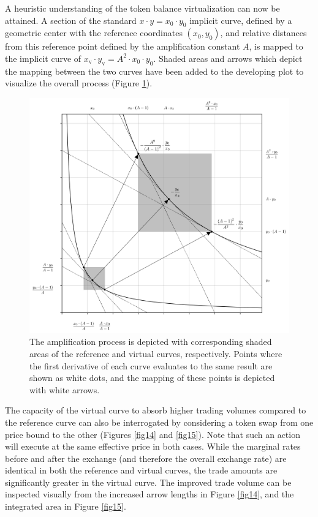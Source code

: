\documentclass{article}
\begin{document}
A heuristic understanding of the token balance virtualization can now be attained. A section of the standard $x \cdot y = x_{0} \cdot y_{0}$ implicit curve, defined by a geometric center with the reference coordinates $\left( x_{0}, y_{0} \right)$, and relative distances from this reference point defined by the amplification constant $A$, is mapped to the implicit curve of $x_{\text{v}} \cdot y_{\text{v}} = A^{2} \cdot x_{0} \cdot y_{0}$. Shaded areas and arrows which depict the mapping between the two curves have been added to the developing plot to visualize the overall process (Figure \ref{fig13}).

\begin{figure}[ht]
    \centering
    \includegraphics[width=\textwidth]{fig13.png}
    \captionsetup{
        justification=raggedright,
        singlelinecheck=false,
        font=small,
        labelfont=bf,
        labelsep=quad,
        format=plain
    }
    \caption{The amplification process is depicted with corresponding shaded areas of the reference and virtual curves, respectively. Points where the first derivative of each curve evaluates to the same result are shown as white dots, and the mapping of these points is depicted with white arrows.}
    \label{fig13}
\end{figure}

The capacity of the virtual curve to absorb higher trading volumes compared to the reference curve can also be interrogated by considering a token swap from one price bound to the other (Figures \ref{fig14} and \ref{fig15}). Note that such an action will execute at the same effective price in both cases. While the marginal rates before and after the exchange (and therefore the overall exchange rate) are identical in both the reference and virtual curves, the trade amounts are significantly greater in the virtual curve. The improved trade volume can be inspected visually from the increased arrow lengths in Figure \ref{fig14}, and the integrated area in Figure \ref{fig15}.
\end{document}
